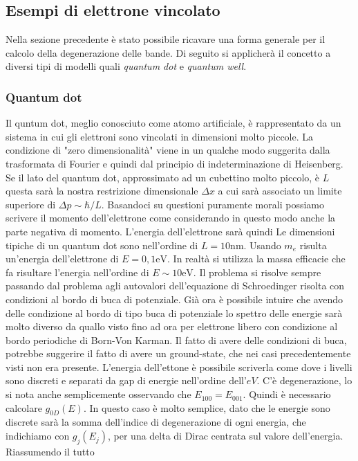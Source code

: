 \subsection{Esempi di elettrone vincolato}
Nella sezione precedente è stato possibile ricavare una forma generale per il calcolo della degenerazione delle bande. Di seguito si applicherà il concetto a diversi tipi di modelli quali \textit{quantum dot} e \textit{quantum well}.
\subsubsection{Quantum dot}
Il quntum dot, meglio conosciuto come atomo artificiale, è rappresentato da un sistema in cui gli elettroni sono vincolati in dimensioni molto piccole. La condizione di "zero dimensionalità" viene in un qualche modo suggerita dalla trasformata di Fourier e quindi dal principio di indeterminazione di Heisenberg. Se il lato del quantum dot, approssimato ad un cubettino molto piccolo, è $L$ questa sarà la nostra restrizione dimensionale $\Delta x$ a cui sarà associato un limite superiore di $\Delta p \sim \hbar/L$. Basandoci su questioni puramente morali possiamo scrivere il momento dell'elettrone come 
considerando in questo modo anche la parte negativa di momento. L'energia dell'elettrone sarà quindi
Le dimensioni tipiche di un quantum dot sono nell'ordine di $L=10\text{nm}$. Usando $m_e$ risulta un'energia dell'elettrone di $E=0,1\text{eV}$. In realtà si utilizza la massa efficacie che fa risultare l'energia nell'ordine di $E\sim 10 \text{eV}$. Il problema si risolve sempre passando dal problema agli autovalori dell'equazione di Schroedinger risolta con condizioni al bordo di buca di potenziale. Già ora è possibile intuire che avendo delle condizione al bordo di tipo buca di potenziale lo spettro delle energie sarà molto diverso da quallo visto fino ad ora per elettrone libero con condizione al bordo periodiche di Born-Von Karman. Il fatto di avere delle condizioni di buca, potrebbe suggerire il fatto di avere un ground-state, che nei casi precedentemente visti non era presente. L'energia dell'ettone è possibile scriverla come
dove i livelli sono discreti e separati da gap di energie nell'ordine dell'$eV$. C'è degenerazione, lo si nota anche semplicemente osservando che $E_{100} = E_{001}$. Quindi è necessario calcolare $g_{0D}(E)$. In questo caso è molto semplice, dato che le energie sono discrete sarà la somma dell'indice di degenerazione di ogni energia, che indichiamo con $g_j(E_j)$, per una delta di Dirac centrata sul valore dell'energia. Riassumendo il tutto
